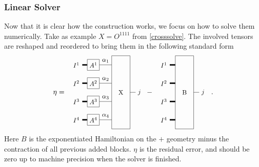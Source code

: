 \documentclass[twocolumn]{article}
\newcounter{a}
\newcounter{b}
\begin{document}
\subsubsection{Linear Solver}

\def \pepoct { \begin{tikzpicture}[baseline=0.5]
        \draw (0,2.5)-- (0,-1.5) -- (1,-1.5)-- (1,2.5) -- cycle;

        \node[draw=none] (x)  at (0.5,0.5) {X};

        \node[draw, minimum size=0.6cm] (n1)  at (-1,2) {$A^1$};
        \node[draw, minimum size=0.6cm] (n2)  at (-1,1) {$A^2$};
        \node[draw, minimum size=0.6cm] (n3)  at (-1,0) {$A^3$};
        \node[draw, minimum size=0.6cm] (n4)  at (-1,-1) {$A^4$};

        \draw (n1) -- node [above] {$\alpha_1$} (0,2);
        \draw (n2) -- node [above] {$\alpha_2$} (0,1);
        \draw (n3) -- node [above] {$\alpha_3$} (0,0);
        \draw (n4) -- node [above] {$\alpha_4$} (0,-1);

        \draw[line width=0.75mm] (n1) -- ++(-0.6,0) node [left] {$I^1$};
        \draw[line width=0.75mm] (n2) -- ++(-0.6,0) node [left] {$I^2$};
        \draw[line width=0.75mm] (n3) -- ++(-0.6,0) node [left] {$I^3$};
        \draw[line width=0.75mm] (n4) -- ++(-0.6,0) node [left] {$I^4$};

        \draw (1,0.5) -- (1.3,0.5)  node [right] {$j$} ;

    \end{tikzpicture} }

\def \blockct { \begin{tikzpicture}[baseline=3]
        \draw (0,2.5)-- (0,-1.5) -- (1,-1.5)-- (1,2.5) -- cycle;

        \node[draw=none] (x)  at (0.5,0.5) {B};

        \draw[line width=0.75mm] (-0.3,2)  node [left] {$I^1$}  -- (0,2) ;
        \draw[line width=0.75mm] (-0.3,1)  node [left] {$I^2$} -- (0,1);
        \draw[line width=0.75mm] (-0.3,0)  node [left] {$I^3$} -- (0,0);
        \draw[line width=0.75mm] (-0.3,-1)  node [left] {$I^4$} -- (0,-1);

        \draw (1,0.5) -- (1.3,0.5)  node [right] {$j$} ;

    \end{tikzpicture} }

Now that it is clear how  the construction works, we focus on how to solve them numerically. Take as example  $X=O^{1 1 1 1}$ from \cref{crosssolve}. The involved tensors are reshaped and reordered to bring them in the following standard form
\begin{equation} \label{extract_x}
    \eta =  \vcenter{\hbox{  \scalebox{0.9}{ \pepoct }} } - \vcenter{\hbox{  \scalebox{0.9}{ \blockct } }} .
\end{equation}
Here $B$ is the exponentiated Hamiltonian on the $+$ geometry minus the contraction of all previous added blocks. $\eta$ is the residual error, and should be zero up to machine precision when the solver is finished.
\end{document}
